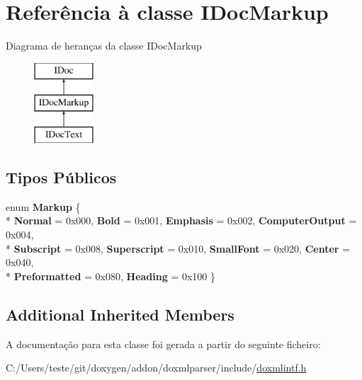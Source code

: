 \hypertarget{class_i_doc_markup}{\section{Referência à classe I\-Doc\-Markup}
\label{class_i_doc_markup}
}
Diagrama de heranças da classe I\-Doc\-Markup\begin{figure}[H]
\begin{center}
\leavevmode
\includegraphics[height=3.000000cm]{class_i_doc_markup}
\end{center}
\end{figure}
\subsection*{Tipos Públicos}
\begin{DoxyCompactItemize}
\item 
enum {\bfseries Markup} \{ \\*
{\bfseries Normal} = 0x000, 
{\bfseries Bold} = 0x001, 
{\bfseries Emphasis} = 0x002, 
{\bfseries Computer\-Output} = 0x004, 
\\*
{\bfseries Subscript} = 0x008, 
{\bfseries Superscript} = 0x010, 
{\bfseries Small\-Font} = 0x020, 
{\bfseries Center} = 0x040, 
\\*
{\bfseries Preformatted} = 0x080, 
{\bfseries Heading} = 0x100
 \}
\end{DoxyCompactItemize}
\subsection*{Additional Inherited Members}


A documentação para esta classe foi gerada a partir do seguinte ficheiro\-:\begin{DoxyCompactItemize}
\item 
C\-:/\-Users/teste/git/doxygen/addon/doxmlparser/include/\hyperlink{include_2doxmlintf_8h}{doxmlintf.\-h}\end{DoxyCompactItemize}
